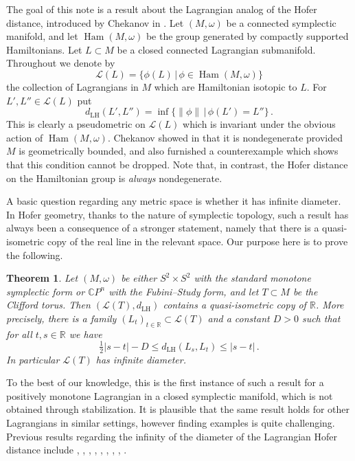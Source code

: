 \documentclass[11pt%
]{article}
\newtheorem{thm}{Theorem}[section]
\theoremstyle{definition}
\newcommand{\R}{{\mathbb{R}}}
\newcommand{\C}{{\mathbb{C}}}
\newcommand{\cL}{{\mathcal{L}}}
\DeclareMathOperator{\Ham}{Ham}
\DeclareMathOperator{\0}{\operatorname{\mathbf{0}}}
\begin{document}
The goal of this note is a result about the Lagrangian analog of the Hofer distance, introduced by Chekanov in \cite{Chekanov_Invt_Finsler_Metrics_Space_Lagrangians}. Let $(M,\omega)$ be a connected symplectic manifold, and let $\Ham(M,\omega)$ be the group generated by compactly supported Hamiltonians. Let $L\subset M$ be a closed connected Lagrangian submanifold. Throughout we denote by
$$\cL(L) = \{\phi(L)\,|\,\phi\in\Ham(M,\omega)\}$$
the collection of Lagrangians in $M$ which are Hamiltonian isotopic to $L$. For $L',L'' \in \cL(L)$ put
$$d_{\mathrm{LH}}(L',L'') = \inf\{\|\phi\|\,|\,\phi(L')=L''\}\,.$$
This is clearly a pseudometric on $\cL(L)$ which is invariant under the obvious action of $\Ham(M,\omega)$. Chekanov showed in \cite{Chekanov_Invt_Finsler_Metrics_Space_Lagrangians} that it is nondegenerate provided $M$ is geometrically bounded, and also furnished a counterexample which shows that this condition cannot be dropped. Note that, in contrast, the Hofer distance on the Hamiltonian group is \emph{always} nondegenerate.

A basic question regarding any metric space is whether it has infinite diameter. In Hofer geometry, thanks to the nature of symplectic topology, such a result has always been a consequence of a stronger statement, namely that there is a quasi-isometric copy of the real line in the relevant space. Our purpose here is to prove the following.
\begin{thm}\label{thm:main}
  Let $(M,\omega)$ be either $S^2\times S^2$ with the standard monotone symplectic form or $\C P^n$ with the Fubini--Study form, and let $T\subset M$ be the Clifford torus. Then $(\cL(T),d_{\mathrm{LH}})$ contains a quasi-isometric copy of $\R$. More precisely, there is a family $(L_t)_{t\in \R}\subset \cL(T)$ and a constant $D>0$ such that for all $t,s \in \R$ we have
  $$\tfrac 12 |s-t| - D \leq d_{\mathrm{LH}}(L_s,L_t) \leq |s-t|\,.$$
  In particular $\cL(T)$ has infinite diameter.
\end{thm}
\noindent To the best of our knowledge, this is the first instance of such a result for a positively monotone Lagrangian in a closed symplectic manifold, which is not obtained through stabilization. It is plausible that the same result holds for other Lagrangians in similar settings, however finding examples is quite challenging. Previous results regarding the infinity of the diameter of the Lagrangian Hofer distance include \cite{Oh_Sympl_Top_Geom_Action_Fcnl},  \cite{Khanevsky_Hofers_Metric_Space_Diameters}, \cite{Zapolsky_Hofer_Geom_Weakly_Exact_Lags}, \cite{Seyfaddini_Unboundedness_Lag_Hofer_Dist_Euclidean_Ball}, \cite{Usher_Hofer_Geom_Cot_Fibers}, \cite{Masatani_Family_Lag_Submfds_Bidisks_Lag_Hofer_Metric}, \cite{Gong_Unbounded_Lagrangian_Spectral_Norm_Wrapped_Floer_Coh}, \cite{Trifa_Hofer_Dist_Lag_Links_Disc}, \cite{Dawid_Hofer_Geom_A3_Configs}.
\end{document}
